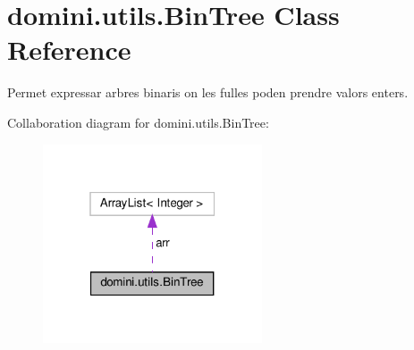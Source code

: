 \hypertarget{classdomini_1_1utils_1_1BinTree}{}\section{domini.\+utils.\+Bin\+Tree Class Reference}
\label{classdomini_1_1utils_1_1BinTree}


Permet expressar arbres binaris on les fulles poden prendre valors enters.  




Collaboration diagram for domini.\+utils.\+Bin\+Tree\+:\nopagebreak
\begin{figure}[H]
\begin{center}
\leavevmode
\includegraphics[width=184pt]{classdomini_1_1utils_1_1BinTree__coll__graph}
\end{center}
\end{figure}
